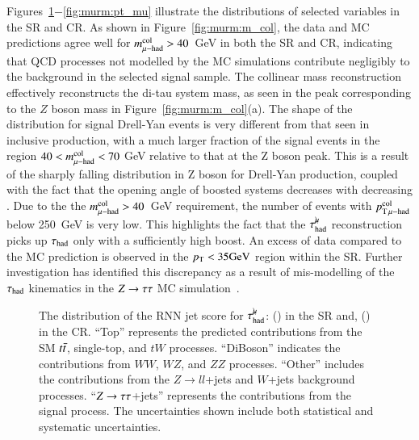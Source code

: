        Figures~\ref{fig:murm:RNN_score}$-$\ref{fig:murm:pt_mu} illustrate the distributions of selected variables in the SR and CR. 
        As shown in Figure~\ref{fig:murm:m_col}, the data and MC predictions 
        agree well for $m_{\mu\mathrm{-}\mathrm{had}}^\mathrm{col} > 40$~GeV in both the SR and CR, indicating that QCD processes not modelled 
        by the MC simulations contribute negligibly to the background in the selected signal sample. The collinear 
        mass reconstruction effectively reconstructs the di-tau system mass, as seen in the peak corresponding to the $Z$ boson mass 
        in Figure~\ref{fig:murm:m_col}(a). The shape of the \mcol distribution for signal 
        Drell-Yan events is very different from that seen
        in inclusive production, with a much larger fraction of the signal events in the 
        region $40 < m_{\mu\mathrm{-}\mathrm{had}}^\mathrm{col} < 70$ GeV relative to that at the Z boson peak.  
        This is a result of the sharply falling distribution in Z boson \pT for Drell-Yan 
        production, coupled with the fact that the opening angle of boosted \tmth systems 
        decreases with decreasing \mcol.
        Due to the the $m_{\mu\mathrm{-}\mathrm{had}}^\mathrm{col} > 40$~GeV requirement, the number of events with $p_{\mathrm{T}\,\mu\mathrm{-}\mathrm{had}}^\mathrm{col}$ below 250~GeV is very low. 
        This highlights the fact that the $\tau_\mathrm{had}^{\mu\mkern-10mu\backslash}$ reconstruction picks up $\tau_{\text{had}}$ only with a sufficiently high boost. 
        An excess of data compared to the MC prediction is observed in the $p_{\text{T}} < 35 \text{GeV}$ region within the SR. 
        Further investigation has identified this discrepancy as a result of mis-modelling of the $\tau_{\text{had}}$ kinematics in 
        the $Z \rightarrow \tau\tau$ MC simulation~\cite{Dong:2899443}.
        \begin{figure}[htbp]
            \centering
            \caption{
                The distribution of the RNN jet score for $\tau_\mathrm{had}^{\mu\mkern-10mu\backslash}$: (\protect{}) in the SR and,
                (\protect{}) in the CR. 
                ``Top'' represents the predicted contributions from the SM $t\bar{t}$, single-top, and $tW$ processes. 
                ``DiBoson'' indicates the contributions from $WW$, $WZ$, and $ZZ$ processes. 
                ``Other'' includes the contributions from the $Z\rightarrow ll$+jets and $W$+jets background processes. 
                ``$Z \rightarrow \tau\tau$+jets'' represents the contributions from the signal process.
                The uncertainties shown include both statistical and systematic uncertainties.
            }
            \label{fig:murm:RNN_score}
        \end{figure}

